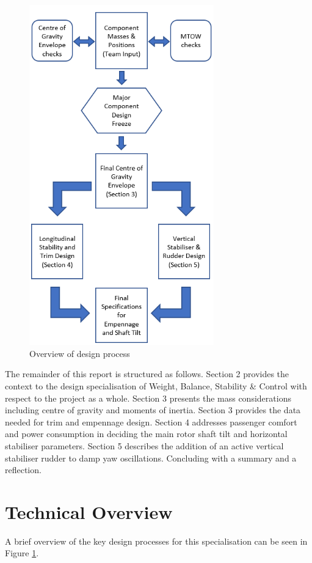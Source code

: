 \documentclass[11pt,a4paper]{article}
\begin{document}
\begin{figure}
\begin{center}
    \includegraphics[width=8cm]{Flowchart2.PNG}
\end{center}
    \caption{Overview of design process}
    \label{fig:flow}
\end{figure}
The remainder of this report is structured as follows. Section 2 provides the  context to the design specialisation of Weight, Balance, Stability \& Control with respect to the project as a whole. Section 3 presents the mass considerations including centre of gravity and moments of inertia. Section 3 provides the data needed for trim and empennage design. Section 4 addresses passenger comfort and power consumption in deciding the main rotor shaft tilt and horizontal stabiliser parameters. Section 5 describes the addition of an active vertical stabiliser rudder to damp yaw oscillations. Concluding with a summary and a reflection.
\section{Technical Overview}
A brief overview of the key design processes for this specialisation can be seen in  Figure \ref{fig:flow}.
\end{document}
